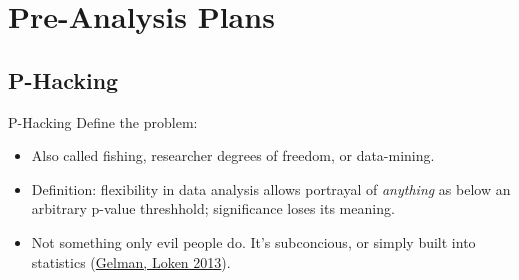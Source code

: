 \documentclass[aspectratio=169]{beamer}
\begin{document}
\section{Pre-Analysis Plans}
\subsection*{P-Hacking}
\begin{frame}[<.->]{P-Hacking}
Define the problem:
\begin{itemize}
\item
Also called fishing, researcher degrees of freedom, or data-mining.
\item
Definition: flexibility in data analysis allows portrayal of \textit{anything} as below an arbitrary p-value threshhold; significance loses its meaning.
\item
Not something only evil people do. It's subconcious, or simply built into statistics (\href{http://www.stat.columbia.edu/~gelman/research/unpublished/p_hacking.pdf}{Gelman, Loken 2013}).
\end{itemize}
\end{frame}

\end{document}
